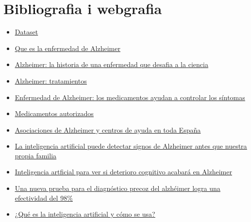 \documentclass[a4paper,12pt]{article}
\begin{document}
\section*{Bibliografia i webgrafia}
\begin{itemize}
    \item \href{https://www.kaggle.com/datasets/uraninjo/augmented-alzheimer-mri-dataset?resource=download}{\underline{Dataset}}
    \item \href{https://www.alz.org/alzheimer-demencia/que-es-la-enfermedad-de-alzheimer }{\underline{Que es la enfermedad de Alzheimer}}
    \item \href{https://www.caeme.org.ar/alzheimer-la-historia-de-una-enfermedad-que-desafia-a-la-ciencia/}{\underline{Alzheimer: la historia de una enfermedad que desafia a la ciencia }}
    \item \href{https://www.alz.org/alzheimer-demencia/tratamientos}{\underline{Alzheimer: tratamientos}}
    \item \href{https://www.mayoclinic.org/es-es/diseases-conditions/alzheimers-disease/in-depth/alzheimers/art-20048103}{\underline{Enfermedad de Alzheimer: los medicamentos ayudan a controlar los síntomas}}
    \item \href{http://www.alzfae.org/fundacion/549/medicamentos-autorizados}{\underline{Medicamentos autorizados}}
    \item \href{https://aiudo.es/asociaciones-de-alzheimer-y-centros/#asociaciones-de-alzheimer}{\underline{Asociaciones de Alzheimer y centros de ayuda en toda España}}
    \item \href{https://www.aecoc.es/innovation-hub-noticias/la-inteligencia-artificial-puede-detectar-signos-de-alzheimer-antes-que-nuestra-propia-familia/}{\underline{La inteligencia artificial puede detectar signos de Alzheimer antes que nuestra propia familia}}
    \item \href{https://www.lavanguardia.com/vida/20220427/8225520/inteligencia-artificial-ver-deterioro-cognitivo-acabara-alzheimer.html}{\underline{Inteligencia artficial para ver si deterioro cognitivo acabará en Alzheimer}}
    \item \href{https://www.larazon.es/sociedad/20220620/ajwe2fywxzgnta7zt4godk4bae.html}{\underline{Una nueva prueba para el diagnóstico precoz del alzhéimer logra una efectividad del 98\%}}
    \item \href{https://www.europarl.europa.eu/news/es/headlines/society/20200827STO85804/que-es-la-inteligencia-artificial-y-como-se-usa}{\underline{¿Qué es la inteligencia artificial y cómo se usa?}}

\end{itemize}
\end{document}
